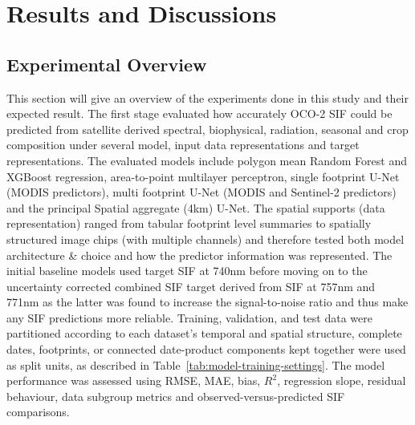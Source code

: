 \chapter{Results and Discussions\label{cha:chapter6}}

\section{Experimental Overview}

This section will give an overview of the experiments done in this study and their expected result. The first stage evaluated how accurately OCO-2 SIF could be predicted from satellite derived spectral, biophysical, radiation, seasonal and crop composition under several model, input data representations and target representations. The evaluated models include polygon mean Random Forest and XGBoost regression, area-to-point multilayer perceptron, single footprint U-Net (MODIS predictors), multi footprint U-Net (MODIS and Sentinel-2 predictors) and the principal Spatial aggregate (4km) U-Net. The spatial supports (data representation) ranged from tabular footprint level summaries to spatially structured image chips (with multiple channels) and therefore tested both model architecture \& choice and how the predictor information was represented. The initial baseline models used target SIF at 740nm before moving on to the uncertainty corrected combined SIF target derived from SIF at 757nm and 771nm as the latter was found to increase the signal-to-noise ratio and thus make any SIF predictions more reliable. Training, validation, and test data were partitioned according to each dataset's temporal and spatial structure, complete dates, footprints, or connected date-product components kept together were used as split units, as described in Table~\ref{tab:model-training-settings}. The model performance was assessed using RMSE, MAE, bias, $R^2$, regression slope, residual behaviour, data subgroup metrics and observed-versus-predicted SIF comparisons.

